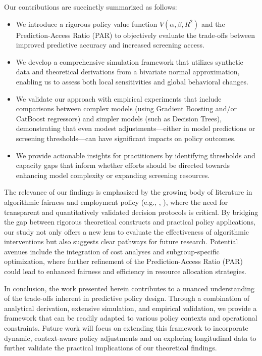\documentclass{article} %
\begin{document}
Our contributions are succinctly summarized as follows:
\begin{itemize}
    \item We introduce a rigorous policy value function \( V(\alpha,\beta,R^2) \) and the Prediction-Access Ratio (PAR) to objectively evaluate the trade-offs between improved predictive accuracy and increased screening access.
    \item We develop a comprehensive simulation framework that utilizes synthetic data and theoretical derivations from a bivariate normal approximation, enabling us to assess both local sensitivities and global behavioral changes.
    \item We validate our approach with empirical experiments that include comparisons between complex models (using Gradient Boosting and/or CatBoost regressors) and simpler models (such as Decision Trees), demonstrating that even modest adjustments—either in model predictions or screening thresholds—can have significant impacts on policy outcomes.
    \item We provide actionable insights for practitioners by identifying thresholds and capacity gaps that inform whether efforts should be directed towards enhancing model complexity or expanding screening resources.
\end{itemize}

The relevance of our findings is emphasized by the growing body of literature in algorithmic fairness and employment policy (e.g., \cite{kern2021fairness}, \cite{frank2023ai}), where the need for transparent and quantitatively validated decision protocols is critical. By bridging the gap between rigorous theoretical constructs and practical policy applications, our study not only offers a new lens to evaluate the effectiveness of algorithmic interventions but also suggests clear pathways for future research. Potential avenues include the integration of cost analyses and subgroup-specific optimization, where further refinement of the Prediction-Access Ratio (PAR) could lead to enhanced fairness and efficiency in resource allocation strategies.

In conclusion, the work presented herein contributes to a nuanced understanding of the trade-offs inherent in predictive policy design. Through a combination of analytical derivation, extensive simulation, and empirical validation, we provide a framework that can be readily adapted to various policy contexts and operational constraints. Future work will focus on extending this framework to incorporate dynamic, context-aware policy adjustments and on exploring longitudinal data to further validate the practical implications of our theoretical findings.
\end{document}
